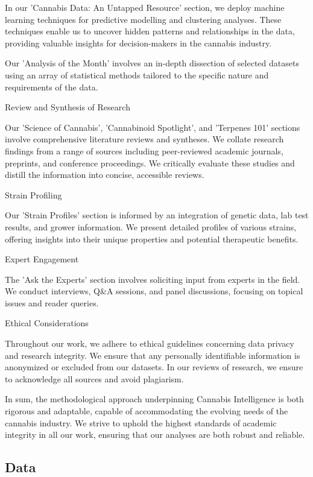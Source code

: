 \documentclass[../article.tex, 12pt]{subfiles}
\begin{document}
\begin{multicols*}{2}
In our 'Cannabis Data: An Untapped Resource' section, we deploy machine learning techniques for predictive modelling and clustering analyses. These techniques enable us to uncover hidden patterns and relationships in the data, providing valuable insights for decision-makers in the cannabis industry.

Our 'Analysis of the Month' involves an in-depth dissection of selected datasets using an array of statistical methods tailored to the specific nature and requirements of the data.

Review and Synthesis of Research

Our 'Science of Cannabis', 'Cannabinoid Spotlight', and 'Terpenes 101' sections involve comprehensive literature reviews and syntheses. We collate research findings from a range of sources including peer-reviewed academic journals, preprints, and conference proceedings. We critically evaluate these studies and distill the information into concise, accessible reviews.

Strain Profiling

Our 'Strain Profiles' section is informed by an integration of genetic data, lab test results, and grower information. We present detailed profiles of various strains, offering insights into their unique properties and potential therapeutic benefits.

Expert Engagement

The 'Ask the Experts' section involves soliciting input from experts in the field. We conduct interviews, Q\&A sessions, and panel discussions, focusing on topical issues and reader queries.

Ethical Considerations

Throughout our work, we adhere to ethical guidelines concerning data privacy and research integrity. We ensure that any personally identifiable information is anonymized or excluded from our datasets. In our reviews of research, we ensure to acknowledge all sources and avoid plagiarism.

In sum, the methodological approach underpinning Cannabis Intelligence is both rigorous and adaptable, capable of accommodating the evolving needs of the cannabis industry. We strive to uphold the highest standards of academic integrity in all our work, ensuring that our analyses are both robust and reliable.


\subsection{Data}


\end{multicols*}
\end{document}
